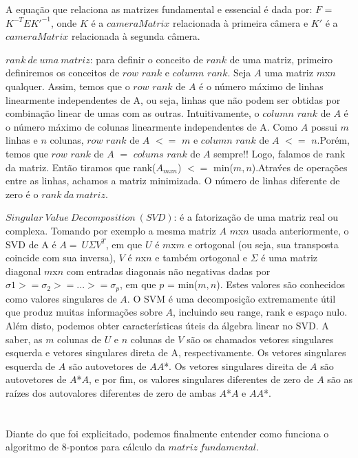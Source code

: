 \documentclass[conference]{IEEEtran}
\begin{document}
	A equa\c{c}\~ao que relaciona as matrizes fundamental e essencial \'e dada por:
	$F$ = $K^{-T}EK'^{-1}$, onde $K$ \'e a $cameraMatrix$ relacionada \`a primeira c\^amera e $K'$ \'e a $cameraMatrix$ 
	relacionada \`a segunda c\^amera.
	
	$rank\> de\> uma\> matriz$: para definir o conceito de $rank$ de uma matriz, primeiro definiremos os conceitos de $row$ $rank$
	e $column$ $rank$. Seja $A$ uma matriz $m$x$n$ qualquer. Assim, temos que o $row$ $rank$ de $A$ \'e o n\'umero m\'aximo
	de linhas linearmente independentes de A, ou seja, linhas que n\~ao podem ser obtidas por combina\c{c}\~ao linear de 
	umas com as outras. Intuitivamente, o $column$ $rank$ de $A$ \'e o n\'umero m\'aximo de colunas linearmente independentes
	 de A. Como $A$ possui $m$ linhas e $n$ colunas, $row$ $rank$ de $A$ $<=$ $m$ e $column$ $rank$ de $A$ $<=$ $n$.Por\'em, 
	 temos que $row$ $rank$ de $A$ $=$ $colums$ $rank$ de $A$ sempre!! Logo, falamos de rank da matriz. Ent\~ao tiramos que
	 rank($A_{mxn}$) $<=$ min($m,n$).Atra\'ves de opera\c{c}\~oes entre as linhas, achamos a matriz minimizada. O n\'umero
	 de linhas diferente de zero \'e o $rank \> da \> matriz$.
	 
	$Singular\> Value\> Decomposition\>(SVD)$: \'e a fatoriza\c{c}\~ao de uma matriz real ou complexa. Tomando por exemplo
	a mesma matriz $A$ $m$x$n$ usada anteriormente, o SVD de A \'e $A=\> U\Sigma V^{T}$, em que $U$ \'e $m$x$m$ e ortogonal 
	(ou seja, sua transposta coincide com sua inversa), $V$ \'e $n$x$n$ e tamb\'em ortogonal e $\Sigma$ \'e uma matriz
	diagonal $m$x$n$ com entradas diagonais n\~ao negativas dadas por $\sigma{1}>=\sigma_{2}>=...>=\sigma_{p}$, em que $p$
	 = min($m,n$). Estes valores s\~ao conhecidos como valores singulares de $A$. O SVM \'e uma decomposi\c{c}\~ao extremamente 
	 \'util que produz muitas informa\c{c}\~oes sobre $A$, incluindo seu range, rank e espa\c{c}o nulo. Al\'em disto, 
	 podemos obter caracter\'isticas \'uteis da \'algebra linear no SVD. A saber, as $m$ colunas de $U$ e $n$ colunas de $V$ s\~ao os
	 chamados vetores singulares esquerda e vetores singulares direta de A, respectivamente. Os vetores singulares esquerda de $A$ s\~ao
	 autovetores de $AA$*. Os vetores singulares direita de $A$ s\~ao autovetores de $A$*$A$, e por fim, os valores singulares 
	 diferentes de zero de $A$ s\~ao as ra\'izes dos autovalores diferentes de zero de ambas $A$*$A$ e $AA$*.
	 \\
	 \\
	 \\
	 Diante do que foi explicitado, podemos finalmente entender como funciona o algoritmo de 8-pontos para c\'alculo da 
	 $matriz\> fundamental$.
	
\end{document}
